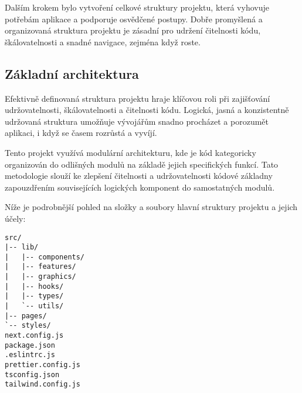 Dalším krokem bylo vytvoření celkové struktury projektu, která vyhovuje potřebám aplikace a podporuje osvědčené postupy.
Dobře promyšlená a organizovaná struktura projektu je zásadní pro udržení čitelnosti kódu, škálovatelnosti a snadné navigace, zejména když  roste.

\subsection{Základní architektura}
\label{subsec:implementace-architektura-zakladni}
Efektivně definovaná struktura projektu hraje klíčovou roli při zajišťování udržovatelnosti, škálovatelnosti a čitelnosti kódu.
Logická, jasná a konzistentně udržovaná struktura umožňuje vývojářům snadno procházet a porozumět aplikaci, i když se  časem rozrůstá a vyvíjí.

Tento projekt využívá modulární architekturu, kde je kód kategoricky organizován do odlišných modulů na základě jejich specifických funkcí.
Tato metodologie slouží ke zlepšení čitelnosti a udržovatelnosti kódové základny zapouzdřením souvisejících logických komponent do samostatných modulů\cite{p_article_react_folder_structure}.

Níže je podrobnější pohled na složky a soubory hlavní struktury projektu a jejich účely:

\begin{lstlisting}[language={[LaTeX]TeX},caption={Struktura projektu},label={lst:project-structure}]
src/
|-- lib/
|   |-- components/
|   |-- features/
|   |-- graphics/
|   |-- hooks/
|   |-- types/
|   `-- utils/
|-- pages/
`-- styles/
next.config.js
package.json
.eslintrc.js
prettier.config.js
tsconfig.json
tailwind.config.js
\end{lstlisting}

